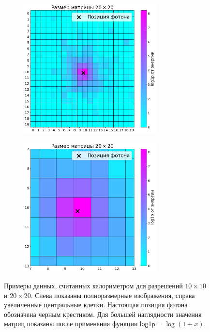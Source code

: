 \documentclass[a4paper,12pt]{extarticle}
\begin{document}
\begin{figure}[t]
    \begin{subfigure}{0.5\textwidth}
        \centering
        \includegraphics[width=0.8\textwidth]{graphics/data_20x20.png}
    \end{subfigure}%
    \begin{subfigure}{0.5\textwidth}
        \centering
        \includegraphics[width=0.8\textwidth]{graphics/data_20x20_zoomed.png}
    \end{subfigure}
    \caption{Примеры данных, считанных калориметром для разрешений $10 \times 10$ и $20 \times 20$. Слева показаны полноразмерные изображения, справа увеличенные центральные клетки. Настоящая позиция фотона обозначена черным крестиком. Для большей наглядности значения матриц показаны после применения функции $\mathsf{log1p} = \log(1 + x)$.}
    \label{image:data_sample}
\end{figure}
\end{document}
